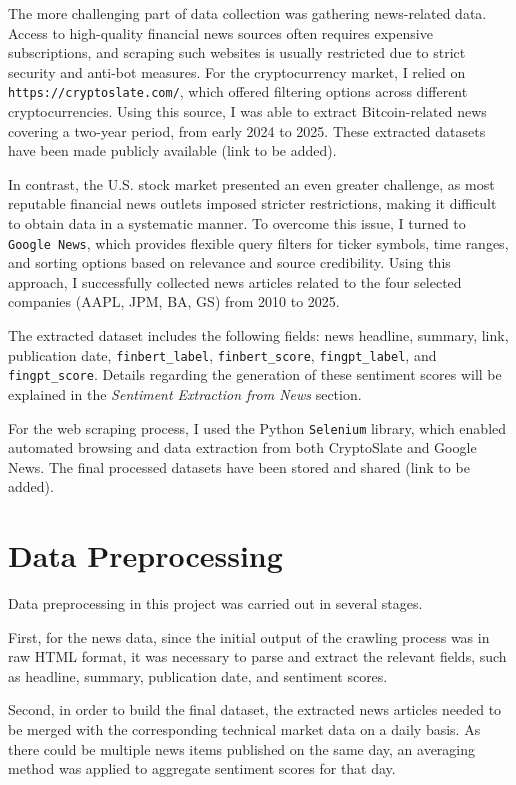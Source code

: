 \documentclass[12pt,a4paper]{report}
\begin{document}
The more challenging part of data collection was gathering news-related data. Access to high-quality financial news sources often requires expensive subscriptions, and scraping such websites is usually restricted due to strict security and anti-bot measures. For the cryptocurrency market, I relied on \texttt{https://cryptoslate.com/}, which offered filtering options across different cryptocurrencies. Using this source, I was able to extract Bitcoin-related news covering a two-year period, from early 2024 to 2025. These extracted datasets have been made publicly available (link to be added).  

In contrast, the U.S. stock market presented an even greater challenge, as most reputable financial news outlets imposed stricter restrictions, making it difficult to obtain data in a systematic manner. To overcome this issue, I turned to \texttt{Google News}, which provides flexible query filters for ticker symbols, time ranges, and sorting options based on relevance and source credibility. Using this approach, I successfully collected news articles related to the four selected companies (AAPL, JPM, BA, GS) from 2010 to 2025.  

The extracted dataset includes the following fields: news headline, summary, link, publication date, \texttt{finbert\_label}, \texttt{finbert\_score}, \texttt{fingpt\_label}, and \texttt{fingpt\_score}. Details regarding the generation of these sentiment scores will be explained in the \textit{Sentiment Extraction from News} section.  

For the web scraping process, I used the Python \texttt{Selenium} library, which enabled automated browsing and data extraction from both CryptoSlate and Google News. The final processed datasets have been stored and shared (link to be added).

\section{Data Preprocessing}

Data preprocessing in this project was carried out in several stages.  

First, for the news data, since the initial output of the crawling process was in raw HTML format, it was necessary to parse and extract the relevant fields, such as headline, summary, publication date, and sentiment scores.  

Second, in order to build the final dataset, the extracted news articles needed to be merged with the corresponding technical market data on a daily basis. As there could be multiple news items published on the same day, an averaging method was applied to aggregate sentiment scores for that day.  
\end{document}

